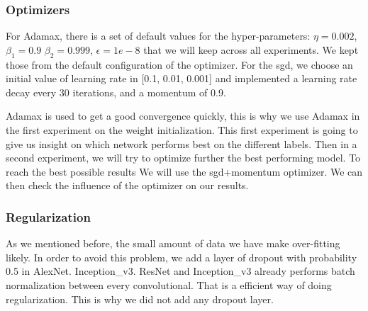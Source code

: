 \subsubsection{Optimizers}
For Adamax, there is a set of default values for the hyper-parameters: \(\eta = 0.002\), \(\beta_1 = 0.9\) \(\beta_2 = 0.999\), \(\epsilon = 1e-8\) that we will keep across all experiments. We kept those from the default configuration of the optimizer. 
For the \gls{sgd}, we choose an initial value of learning rate in [0.1, 0.01, 0.001] and implemented a learning rate decay every 30 iterations, and a momentum of 0.9. 

Adamax is used to get a good convergence quickly, this is why we use Adamax in the first experiment on the weight initialization. This first experiment is going to give us insight on which network performs best on the different labels. Then in a second experiment, we will try to optimize further the best performing model. To reach the best possible results We will use the \gls{sgd}+momentum optimizer. We can then check the influence of the optimizer on our results. 

\subsubsection{Regularization}
As we mentioned before, the small amount of data we have make over-fitting likely. In order to avoid this problem, we add a layer of dropout with probability 0.5 in AlexNet. Inception\_v3. ResNet and Inception\_v3 already performs batch normalization between every convolutional. That is a efficient way of doing regularization. This is why we did not add any dropout layer.  